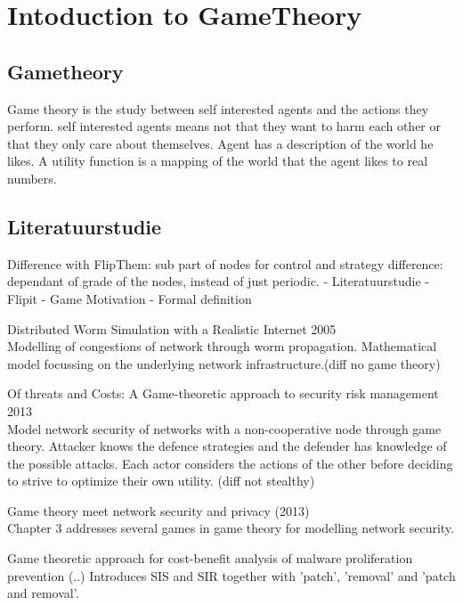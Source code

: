 \chapter{Intoduction to GameTheory}
\label{cha:1}


\section{Gametheory}

Game theory is the study between self interested agents and the actions they perform. self interested agents means not that they want to harm each other or that they only care about themselves. Agent has a description of the world he likes. A utility function is a mapping of the world that the agent likes to real numbers. 


\section{Literatuurstudie}

Difference with FlipThem: sub part of nodes for control and strategy difference: dependant of grade of the nodes, instead of just periodic.
- Literatuurstudie
- Flipit
- Game Motivation
- Formal definition


\begin{description}
\item Distributed Worm Simulation with a Realistic Internet 2005  \\
Modelling of congestions of network through worm propagation. Mathematical model focussing on the underlying network infrastructure.(diff no game theory) 
\item Of threats and Costs: A Game-theoretic approach to security risk management 2013\\
Model network security of networks with a non-cooperative node through game theory. Attacker knows the defence strategies and the defender has knowledge of the possible attacks. Each actor considers the actions of the other before deciding to strive to optimize their own utility. (diff not stealthy)
\item Game theory meet network security and privacy (2013) \\
Chapter 3 addresses several games in game theory for modelling network security.
\item Game theoretic approach for cost-benefit analysis of malware proliferation prevention (..)
Introduces SIS and SIR together with 'patch', 'removal' and 'patch and removal'.
\end{description}

